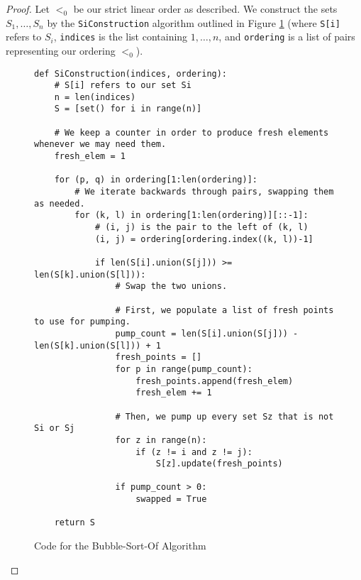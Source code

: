\documentclass[12pt]{article}
\newcommand{\code}[1]{\colorbox{light-gray}{\texttt{#1}}}
\begin{document}
\begin{proof}

Let $<_0$ be our strict linear order as described.  We construct the sets $S_1, \ldots, S_n$ by the \code{SiConstruction} algorithm outlined in Figure \ref{bubblesort-algorithm} (where \code{S[i]} refers to $S_i$, \code{indices} is the list containing $1, \ldots, n$, and \code{ordering} is a list of pairs representing our ordering $<_0$).


\begin{figure}
    \centering\textbf{}
    \caption{Code for the Bubble-Sort-Of Algorithm}\label{bubblesort-algorithm}
    
    \begin{lstlisting}
def SiConstruction(indices, ordering):
    # S[i] refers to our set Si
    n = len(indices)
    S = [set() for i in range(n)]

    # We keep a counter in order to produce fresh elements whenever we may need them.
    fresh_elem = 1
    
    for (p, q) in ordering[1:len(ordering)]:
        # We iterate backwards through pairs, swapping them as needed.
        for (k, l) in ordering[1:len(ordering)][::-1]:
            # (i, j) is the pair to the left of (k, l)
            (i, j) = ordering[ordering.index((k, l))-1]
            
            if len(S[i].union(S[j])) >= len(S[k].union(S[l])):
                # Swap the two unions.
                
                # First, we populate a list of fresh points to use for pumping.
                pump_count = len(S[i].union(S[j])) - len(S[k].union(S[l])) + 1
                fresh_points = []
                for p in range(pump_count):
                    fresh_points.append(fresh_elem)
                    fresh_elem += 1

                # Then, we pump up every set Sz that is not Si or Sj
                for z in range(n):
                    if (z != i and z != j):
                        S[z].update(fresh_points)

                if pump_count > 0:
                    swapped = True
    
    return S
    \end{lstlisting}
\end{figure}


\end{proof}
\end{document}
